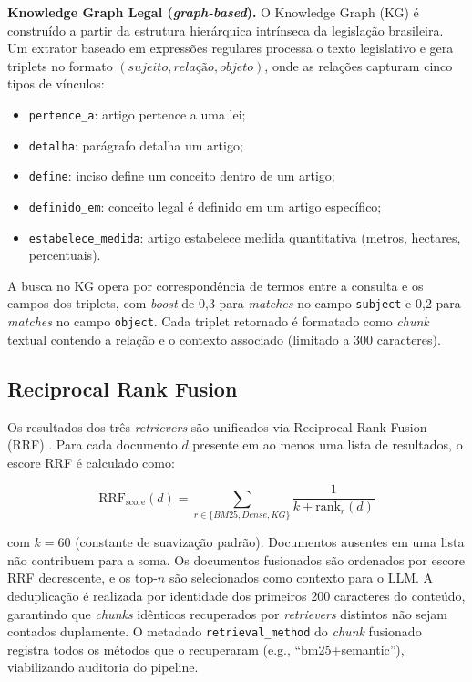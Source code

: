 \documentclass[12pt]{article}
\begin{document}
\textbf{Knowledge Graph Legal (\textit{graph-based}).} O Knowledge Graph (KG) é construído a partir da estrutura hierárquica intrínseca da legislação brasileira. Um extrator baseado em expressões regulares processa o texto legislativo e gera triplets no formato $(sujeito, relação, objeto)$, onde as relações capturam cinco tipos de vínculos:
\begin{itemize}
\item \texttt{pertence\_a}: artigo pertence a uma lei;
\item \texttt{detalha}: parágrafo detalha um artigo;
\item \texttt{define}: inciso define um conceito dentro de um artigo;
\item \texttt{definido\_em}: conceito legal é definido em um artigo específico;
\item \texttt{estabelece\_medida}: artigo estabelece medida quantitativa (metros, hectares, percentuais).
\end{itemize}

A busca no KG opera por correspondência de termos entre a consulta e os campos dos triplets, com \textit{boost} de 0,3 para \textit{matches} no campo \texttt{subject} e 0,2 para \textit{matches} no campo \texttt{object}. Cada triplet retornado é formatado como \textit{chunk} textual contendo a relação e o contexto associado (limitado a 300 caracteres).

\subsection{Reciprocal Rank Fusion}

Os resultados dos três \textit{retrievers} são unificados via Reciprocal Rank Fusion (RRF) \cite{cormack:2009}. Para cada documento $d$ presente em ao menos uma lista de resultados, o escore RRF é calculado como:

\begin{equation}
\text{RRF}_{\text{score}}(d) = \sum_{r \in \{BM25, Dense, KG\}} \frac{1}{k + \text{rank}_r(d)}
\label{eq:rrf_detail}
\end{equation}

\noindent com $k = 60$ (constante de suavização padrão). Documentos ausentes em uma lista não contribuem para a soma. Os documentos fusionados são ordenados por escore RRF decrescente, e os top-$n$ são selecionados como contexto para o LLM. A deduplicação é realizada por identidade dos primeiros 200 caracteres do conteúdo, garantindo que \textit{chunks} idênticos recuperados por \textit{retrievers} distintos não sejam contados duplamente. O metadado \texttt{retrieval\_method} do \textit{chunk} fusionado registra todos os métodos que o recuperaram (e.g., ``bm25+semantic''), viabilizando auditoria do pipeline.
\end{document}
